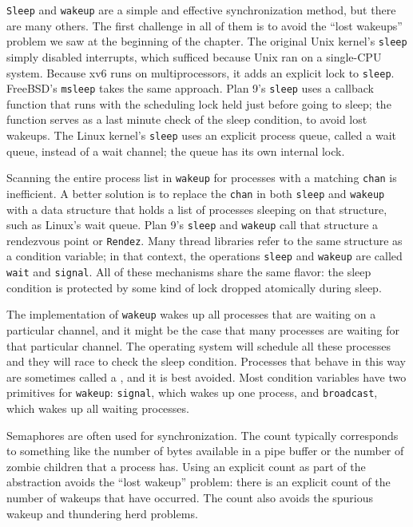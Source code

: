 \lstinline{Sleep}
and
\lstinline{wakeup}
are a simple and effective synchronization method,
but there are many others.
The first challenge in all of them is to
avoid the ``lost wakeups'' problem we saw at the
beginning of the chapter.
The original Unix kernel's
\lstinline{sleep}
simply disabled interrupts,
which sufficed because Unix ran on a single-CPU system.
Because xv6 runs on multiprocessors,
it adds an explicit lock to
\lstinline{sleep}.
FreeBSD's
\lstinline{msleep}
takes the same approach.
Plan 9's 
\lstinline{sleep}
uses a callback function that runs with the scheduling
lock held just before going to sleep;
the function serves as a last minute check
of the sleep condition, to avoid lost wakeups.
The Linux kernel's
\lstinline{sleep}
uses an explicit process queue, called a wait queue, instead of
a wait channel; the queue has its own internal lock.

Scanning the entire process list in
\lstinline{wakeup}
for processes with a matching
\lstinline{chan}
is inefficient.  A better solution is to
replace the
\lstinline{chan}
in both
\lstinline{sleep}
and
\lstinline{wakeup}
with a data structure that holds
a list of processes sleeping on that structure,
such as Linux's wait queue.
Plan 9's
\lstinline{sleep}
and
\lstinline{wakeup}
call that structure a rendezvous point or
\lstinline{Rendez}.
Many thread libraries refer to the same
structure as a condition variable;
in that context, the operations
\lstinline{sleep}
and
\lstinline{wakeup}
are called
\lstinline{wait}
and
\lstinline{signal}.
All of these mechanisms share the same
flavor: the sleep condition is protected by
some kind of lock dropped atomically during sleep.

The implementation of
\lstinline{wakeup}
wakes up all processes that are waiting on a particular channel, and it might be
the case that many processes are waiting for that particular channel.   The
operating system will schedule all these processes and they will race to check
the sleep condition.  Processes that behave in this way are sometimes called a
,
and it is best avoided.
Most condition variables have two primitives for
\lstinline{wakeup}:
\lstinline{signal},
which wakes up one process, and
\lstinline{broadcast},
which wakes up all waiting processes.

Semaphores are often used for synchronization.
The count typically corresponds to something like
the number of bytes available in a pipe buffer
or the number of zombie children that a process has.
Using an explicit count as part of the abstraction
avoids the ``lost wakeup'' problem:
there is an explicit count of the number
of wakeups that have occurred.
The count also avoids the spurious wakeup
and thundering herd problems.

